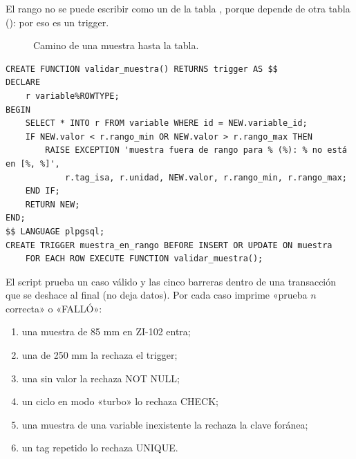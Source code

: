 \documentclass[a4paper,11pt]{article}
\begin{document}
El rango no se puede escribir como un  de la tabla , porque depende de otra tabla (): por eso es un trigger.

\begin{figure}[H]
\centering
{}
\caption{Camino de una muestra hasta la tabla.}
\end{figure}

\begin{lstlisting}[style=sql, caption={Trigger de rango (\codigo{brazo\_4gdl.sql}).}]
CREATE FUNCTION validar_muestra() RETURNS trigger AS $$
DECLARE
    r variable%ROWTYPE;
BEGIN
    SELECT * INTO r FROM variable WHERE id = NEW.variable_id;
    IF NEW.valor < r.rango_min OR NEW.valor > r.rango_max THEN
        RAISE EXCEPTION 'muestra fuera de rango para % (%): % no está en [%, %]',
            r.tag_isa, r.unidad, NEW.valor, r.rango_min, r.rango_max;
    END IF;
    RETURN NEW;
END;
$$ LANGUAGE plpgsql;
CREATE TRIGGER muestra_en_rango BEFORE INSERT OR UPDATE ON muestra
    FOR EACH ROW EXECUTE FUNCTION validar_muestra();
\end{lstlisting}

El script  prueba un caso válido y las cinco barreras dentro de una transacción que se deshace al final (no deja datos). Por cada caso imprime «prueba $n$ correcta» o «FALLÓ»:
\begin{enumerate}
\item una muestra de 85 mm en ZI-102 entra;
\item una de 250 mm la rechaza el trigger;
\item una sin valor la rechaza NOT NULL;
\item un ciclo en modo «turbo» lo rechaza CHECK;
\item una muestra de una variable inexistente la rechaza la clave foránea;
\item un tag repetido lo rechaza UNIQUE.
\end{enumerate}
\end{document}
